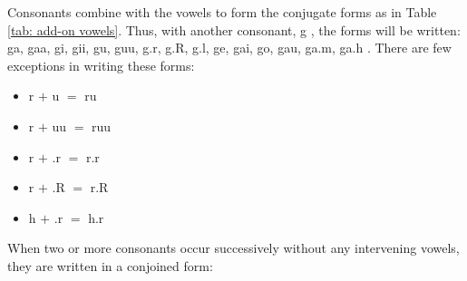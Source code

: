 \documentclass[a4paper, 12pt]{article}
\newcommand \sans[1]{
    \textsanskrit{#1}
}
\begin{document}
Consonants combine with the vowels to form the conjugate forms as in Table \ref{tab: add-on vowels}. Thus, with another consonant, \sans{g}, the forms will be written: \sans{ga, gaa, gi, gii, gu, guu, g.r, g.R, g.l, ge, gai, go, gau, ga.m, ga.h}. There are few exceptions in writing these forms:
\begin{itemize}
    \item \sans{r $+$ u $=$ ru}
    \item \sans{r $+$ uu $=$ ruu}
    \item \sans{r $+$ .r $=$ r.r}
    \item \sans{r $+$ .R $=$ r.R}
    \item \sans{h $+$ .r $=$ h.r}
\end{itemize}

When two or more consonants occur successively without any intervening vowels, they are written in a conjoined form: 
\end{document}
